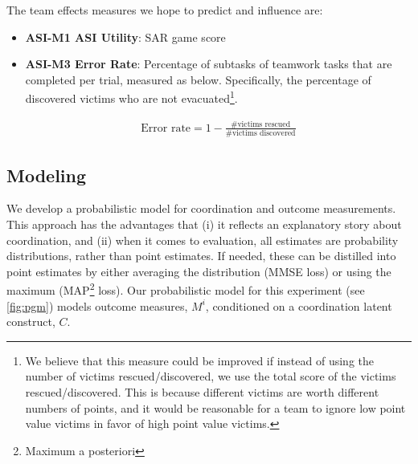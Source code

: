 \noindent The team effects measures we hope to predict and influence are: 

\begin{itemize}

    \item \textbf{ASI-M1 ASI Utility}: SAR game score 

    \item \textbf{ASI-M3 Error Rate}: Percentage of subtasks of teamwork tasks
        that are completed per trial, measured as below.  Specifically, the
        percentage of discovered victims who are not evacuated\footnote{We
            believe that this measure could be improved if instead of using the
            number of victims rescued/discovered, we use the total score of the
            victims rescued/discovered. This is because different victims are
            worth different numbers of points, and it would be reasonable for a
            team to ignore low point value victims in favor of high point value
        victims.}. 

        \begin{align}
            \text{Error rate} = 1 - \frac{\text{\# victims rescued}}{\text{\# victims discovered}}
        \end{align}

\end{itemize}

\subsection{Modeling}
\label{subsec:modeling}

    We develop a probabilistic model for coordination and outcome measurements.
    This approach has the advantages that (i) it reflects an explanatory story
    about coordination, and (ii) when it comes to evaluation, all estimates are
    probability distributions, rather than point estimates.  If needed, these
    can be distilled into point estimates by either averaging the distribution
    (MMSE loss) or using the maximum (MAP\footnote{Maximum a posteriori} loss). 
    Our probabilistic model for this experiment (see \autoref{fig:pgm}) models
    outcome measures, $M^i$, conditioned on a coordination latent construct,
    $C$. 


